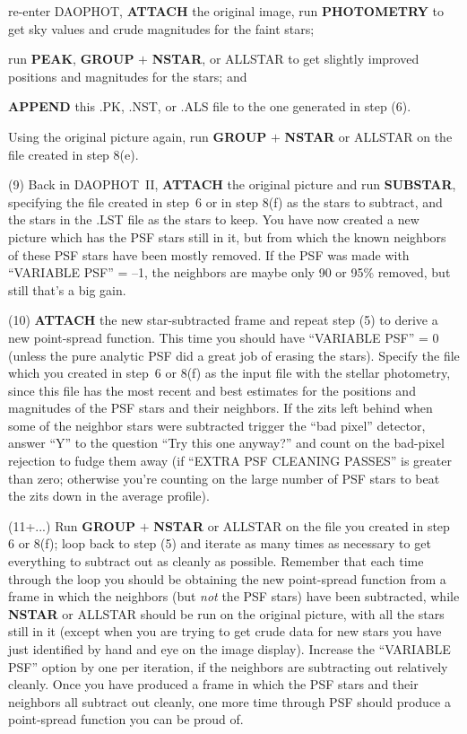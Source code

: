  re-enter DAOPHOT, {\bf ATTACH} the original image, run
{\bf PHOTOMETRY} to get sky values and crude magnitudes for the faint
stars;

 run {\bf PEAK}, {\bf GROUP} $+$ {\bf NSTAR}, or ALLSTAR
to get slightly improved positions and magnitudes for the stars; and

 {\bf APPEND} this .PK, .NST, or .ALS file to the one
generated in step (6).

 Using the original picture again, run {\bf GROUP} $+$
{\bf NSTAR} or ALLSTAR on the file created in step 8(e).

\item{(9)} Back in DAOPHOT~II, {\bf ATTACH} the original picture and
run {\bf SUBSTAR}, specifying the file created in step~6 or in step
8(f) as the stars to subtract, and the stars in the .LST file as the
stars to keep.  You have now created a new picture which has the PSF
stars still in it, but from which the known neighbors of these PSF
stars have been mostly removed.  If the PSF was made with 
``VARIABLE PSF'' = --1, the neighbors are maybe only 90 or 95\%
removed, but still that's a big gain.

\item{(10)} {\bf ATTACH} the new star-subtracted frame and repeat step
(5) to derive a new point-spread function.  This time you should have
``VARIABLE PSF'' = 0 (unless the pure analytic PSF did a great job of
erasing the stars).  Specify the file which
you created in step~6 or 8(f) as the input file with the stellar photometry,
since this file has the most recent and best estimates for the
positions and magnitudes of the PSF stars and their neighbors. If the
zits left behind when some of the neighbor stars were subtracted
trigger the ``bad pixel'' detector, answer ``Y'' to the question
``Try this one anyway?'' and count on the bad-pixel rejection to fudge
them away (if ``EXTRA PSF CLEANING PASSES'' is greater than zero;
otherwise you're counting on the large number of PSF stars to beat the
zits down in the average profile).

\item{(11+...)} Run {\bf GROUP} $+$ {\bf NSTAR} or ALLSTAR on the
file you created in step 6 or 8(f); loop back to step (5) and iterate
as many times as necessary to get everything to subtract out as cleanly
as possible.  Remember that each time through the loop you should be
obtaining the new point-spread function from a frame in which the
neighbors (but {\it not\/} the PSF stars) have been subtracted, while
{\bf NSTAR} or ALLSTAR should be run on the original picture,
with all the stars still in it (except when you are trying to get crude
data for new stars you have just identified by hand and eye on the
image display).  Increase the ``VARIABLE PSF'' option by one per
iteration, if the neighbors are subtracting out relatively cleanly.
Once you have produced a frame in which the PSF stars and their
neighbors all subtract out cleanly, one more time through PSF should
produce a point-spread function you can be proud of.

